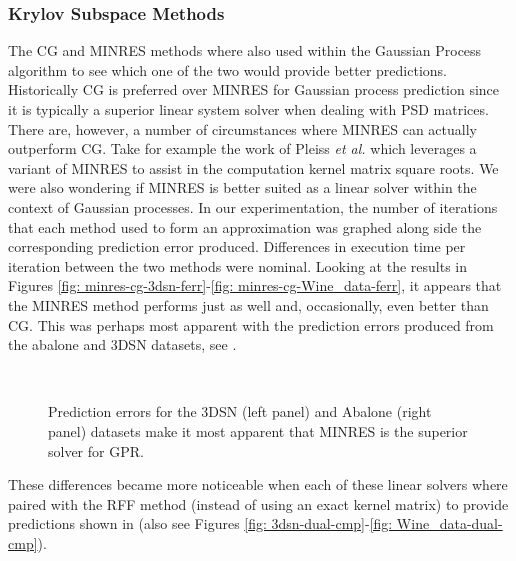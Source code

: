 \subsubsection{Krylov Subspace Methods}\label{Section5.3.2}

The CG and MINRES methods where also used within the Gaussian Process algorithm to see which one of the two would provide better predictions. Historically CG is preferred over MINRES for Gaussian process prediction since it is typically a superior linear system solver when dealing with PSD matrices. There are, however, a number of circumstances where MINRES can actually outperform CG. Take for example the work of Pleiss {\it et al.} \cite{arxiv200611267} which leverages a variant of MINRES to assist in the computation kernel matrix square roots. We were also wondering if MINRES is better suited as a linear solver within the context of Gaussian processes. In our experimentation, the number of iterations that each method used to form an approximation was graphed along side the corresponding prediction error produced. Differences in execution time per iteration between the two methods were nominal. Looking at the results in Figures \ref{fig: minres-cg-3dsn-ferr}-\ref{fig: minres-cg-Wine_data-ferr}, it appears that the MINRES method performs just as well and, occasionally, even better than CG. This was perhaps most apparent with the prediction errors produced from the abalone and 3DSN datasets, see .
\begin{figure}[ht]
    \centering
    \\
    \caption{Prediction errors for the 3DSN (left panel) and Abalone (right panel) datasets make it most apparent that MINRES is the superior solver for GPR.}
    \label{fig: minres-vs-cg-exact}
\end{figure}
These differences became more noticeable when each of these linear solvers where paired with the RFF method (instead of using an exact kernel matrix) to provide predictions shown in  (also see Figures \ref{fig: 3dsn-dual-cmp}-\ref{fig: Wine_data-dual-cmp}).
